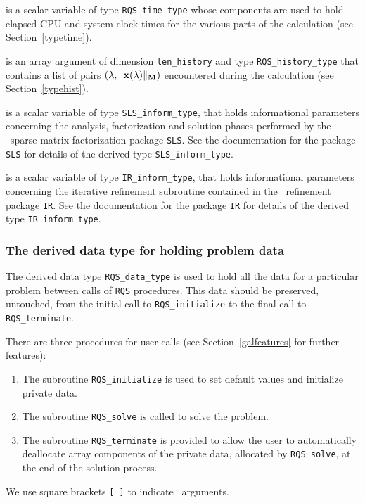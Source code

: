 \documentclass{galahad}
\newcommand{\packagename}{RQS}
\begin{document}
\begin{description}
 is a scalar variable of type {\tt \packagename\_time\_type}
whose components are used to hold elapsed CPU  and system clock times for the
various parts of the calculation (see Section~\ref{typetime}).

 is an array argument of dimension {\tt len\_history} and
type {\tt \packagename\_history\_type} that contains a list of pairs
$(\lambda,\|{\mathbf{x}}(\lambda)\|_{{\mathbf{M}}})$ encountered during the
calculation (see Section~\ref{typehist}).

 is a scalar variable of type {\tt SLS\_inform\_type},
that holds informational parameters concerning the analysis, factorization
and solution phases performed by
the \galahad\ sparse matrix factorization package {\tt SLS}.
See the documentation for the package {\tt SLS} for details of the
derived type {\tt SLS\_inform\_type}.

 is a scalar variable of type {\tt IR\_inform\_type},
that holds informational parameters concerning the iterative refinement
subroutine contained in the \galahad\ refinement package {\tt IR}.
See the documentation for the package {\tt IR} for details of the
derived type {\tt IR\_inform\_type}.


\end{description}


\subsubsection{The derived data type for holding problem data}\label{typedata}
The derived data type
{\tt \packagename\_data\_type}
is used to hold all the data for a particular problem between calls of
{\tt \packagename} procedures.
This data should be preserved, untouched, from the initial call to
{\tt \packagename\_initialize}
to the final call to
{\tt \packagename\_terminate}.


\galarguments
There are three procedures for user calls
(see Section~\ref{galfeatures} for further features):

\begin{enumerate}
\item The subroutine
      {\tt \packagename\_initialize}
      is used to set default values and initialize private data.
\item The subroutine
      {\tt \packagename\_solve}
      is called to solve the problem.
\item The subroutine
      {\tt \packagename\_terminate}
      is provided to allow the user to automatically deallocate array
       components of the private data, allocated by
       {\tt \packagename\_solve},
       at the end of the solution process.
\end{enumerate}
We use square brackets {\tt [ ]} to indicate \optional\ arguments.
\end{document}

